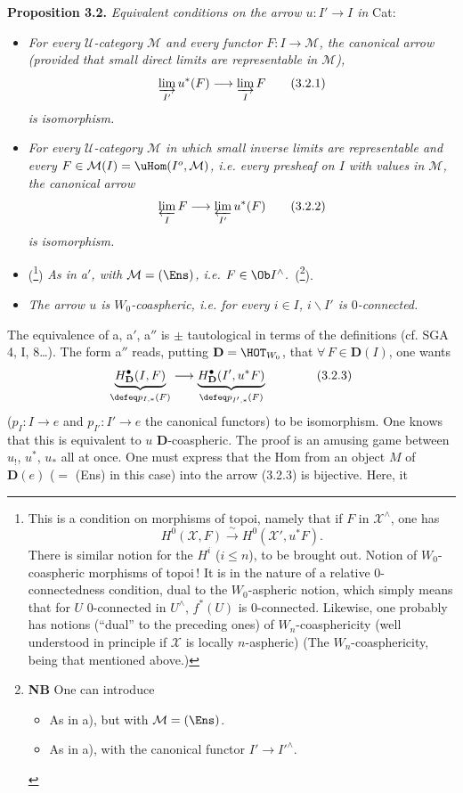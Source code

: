 \noindent\textbf{Proposition 3.2.} \textit{Equivalent conditions on the arrow $u : I' \longrightarrow I$ in} Cat:
\begin{itemize}
\item[a)] \textit{For every $\mathcal{U}$-category $\mathcal{M}$ and every functor $F : I \longrightarrow \mathcal{M}$, the canonical arrow (provided that small direct limits are representable in $\mathcal{M}$),}
\[
\varinjlim_{I'} u^*(F) \longrightarrow \varinjlim_{I} F \tag*{(3.2.1)}
\]
\textit{is} \textit{isomorphism.}
\item[a$'$)] \textit{For every $\mathcal{U}$-category $\mathcal{M}$ in which small inverse limits are representable and every $F \in \mathcal{M}(I) = \uHom(I^o,\mathcal{M})$, i.e. every presheaf on $I$ with values in $\mathcal{M}$, the canonical arrow}
\[
\varprojlim_{I} F \longrightarrow \varprojlim_{I'} u^*(F) \tag*{(3.2.2)}
\]
\textit{is} \textit{isomorphism.}
\item[a$''$)] (\footnote[53]{This is a condition on morphisms of topoi, namely that if $F$ in $\mathcal{X}^{\wedge}$, one has
\[
H^0(\mathcal{X},F) \xrightarrow{\;\sim\;} H^0(\mathcal{X}',u^*F).
\]
There is similar notion for the $H^i$ ($i \leq n$), to be brought out. Notion of $W_0$-coaspheric morphisms of topoi\,! It is in the nature of a relative 0-connectedness condition, dual to the $W_0$-aspheric notion, which simply means that for $U$ 0-connected in $U^{\wedge}$, $f^*(U)$ is 0-connected. Likewise, one probably has notions (``dual'' to the preceding ones) of $W_n$-coasphericity (well understood in principle if $\mathcal{X}$ is locally $n$-aspheric) (The $W_n$-coasphericity, being that mentioned above.)}) \textit{As in a$'$, with $\mathcal{M} = (\Ens)$, i.e. $F \in \Ob I^{\wedge}$.}~(\footnote[54]{\textbf{NB} One can introduce
\begin{itemize}
\item[a$'''$)] As in a), but with $\mathcal{M} = (\Ens)$.
\item[a$^{IV}$)] As in a), with the canonical functor $I' \longrightarrow I'^{\wedge}$.
\end{itemize}}).
\item[b)] \textit{The arrow $u$ is $W_0$-coaspheric, i.e. for every $i \in I$, $i\backslash I'$ is $0$-connected.}
\end{itemize}
The equivalence of a, a$'$, a$''$ is $\pm$ tautological in terms of the definitions (cf. SGA 4, I, 8\dots). The form a$''$ reads, putting $\mathbf{D} = \HOT_{W_0}$, that $\forall\, F \in \mathbf{D}(I)$, one wants
\[
\underbrace{H^{\bullet}_{\mathbf{D}}(I,F)}_{\defeq p_{I,*}(F)} \longrightarrow \underbrace{H^{\bullet}_{\mathbf{D}}(I',u^*F)}_{\defeq p_{I',*}(F)} \qquad \tag*{(3.2.3)}
\]
($p_I : I \longrightarrow e$ and $p_{I'} : I' \longrightarrow e$ the canonical functors) to be isomorphism. One knows that this is equivalent to $u$ $\mathbf{D}$-coaspheric. The proof is an amusing game between $u_!$, $u^*$, $u_*$ all at once. One must express that the Hom from an object $M$ of $\mathbf{D}(e)$ ($=$ (Ens) in this case) into the arrow (3.2.3) is bijective. Here, it %